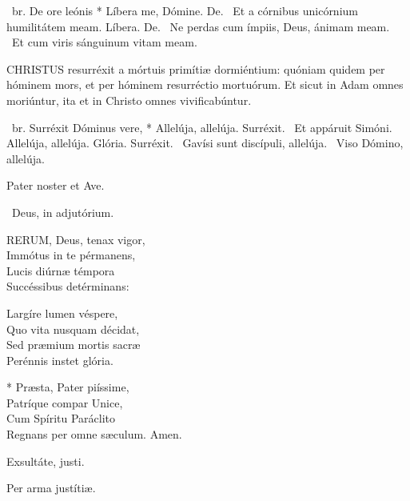 \R\ br. De ore leónis * Líbera me, Dómine. De. \V\ Et a córnibus unicórnium humilitátem meam. Líbera. De. \V\ Ne perdas cum ímpiis, Deus, ánimam meam. \R\ Et cum viris sánguinum vitam meam.




\lettrine[lines=2]{C}{HRISTUS} resurréxit a mórtuis primítiæ dormiéntium: quóniam quidem per hóminem mors, et per hóminem resurréctio mortuórum. Et sicut in Adam omnes moriúntur, ita et in Christo omnes vivificabúntur.

\R\ br. Surréxit Dóminus vere, * Allelúja, allelúja. Surréxit. \V\ Et appáruit Simóni. Allelúja, allelúja. Glória. Surréxit. \V\ Gavísi sunt discípuli, allelúja. \R\ Viso Dómino, allelúja.


\sectionornament


Pater noster et Ave.

\V\ Deus, in adjutórium.


\lettrine[lines=2]{R}{ERUM}, Deus, tenax vigor,\\
Immótus in te pérmanens,\\
Lucis diúrnæ témpora\\
Succéssibus detérminans:

Largíre lumen véspere,\\
Quo vita nusquam décidat,\\
Sed præmium mortis sacræ\\
Perénnis instet glória.

* Præsta, Pater piíssime,\\
Patríque compar Unice,\\
Cum Spíritu Paráclito\\
Regnans per omne sæculum. Amen.

  Exsultáte, justi.



 Per arma justítiæ.


